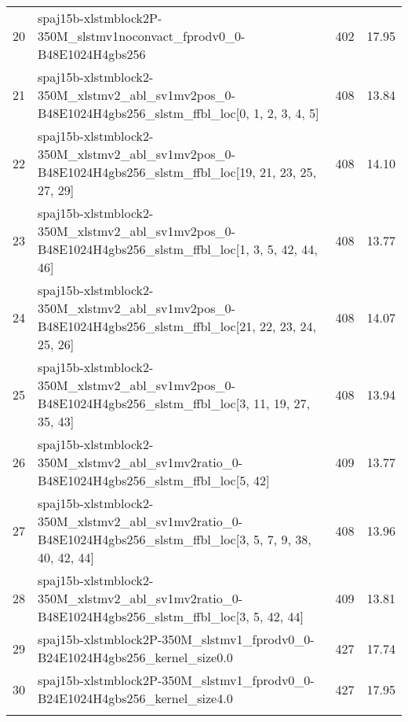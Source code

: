 \begin{tabular}{llrr}
20 & spaj15b-xlstmblock2P-350M_slstmv1noconvact_fprodv0_0-B48E1024H4gbs256 & 402 & 17.95 \\
21 & spaj15b-xlstmblock2-350M_xlstmv2_abl_sv1mv2pos_0-B48E1024H4gbs256_slstm_ffbl_loc[0, 1, 2, 3, 4, 5] & 408 & 13.84 \\
22 & spaj15b-xlstmblock2-350M_xlstmv2_abl_sv1mv2pos_0-B48E1024H4gbs256_slstm_ffbl_loc[19, 21, 23, 25, 27, 29] & 408 & 14.10 \\
23 & spaj15b-xlstmblock2-350M_xlstmv2_abl_sv1mv2pos_0-B48E1024H4gbs256_slstm_ffbl_loc[1, 3, 5, 42, 44, 46] & 408 & 13.77 \\
24 & spaj15b-xlstmblock2-350M_xlstmv2_abl_sv1mv2pos_0-B48E1024H4gbs256_slstm_ffbl_loc[21, 22, 23, 24, 25, 26] & 408 & 14.07 \\
25 & spaj15b-xlstmblock2-350M_xlstmv2_abl_sv1mv2pos_0-B48E1024H4gbs256_slstm_ffbl_loc[3, 11, 19, 27, 35, 43] & 408 & 13.94 \\
26 & spaj15b-xlstmblock2-350M_xlstmv2_abl_sv1mv2ratio_0-B48E1024H4gbs256_slstm_ffbl_loc[5, 42] & 409 & 13.77 \\
27 & spaj15b-xlstmblock2-350M_xlstmv2_abl_sv1mv2ratio_0-B48E1024H4gbs256_slstm_ffbl_loc[3, 5, 7, 9, 38, 40, 42, 44] & 408 & 13.96 \\
28 & spaj15b-xlstmblock2-350M_xlstmv2_abl_sv1mv2ratio_0-B48E1024H4gbs256_slstm_ffbl_loc[3, 5, 42, 44] & 409 & 13.81 \\
29 & spaj15b-xlstmblock2P-350M_slstmv1_fprodv0_0-B24E1024H4gbs256_kernel_size0.0 & 427 & 17.74 \\
30 & spaj15b-xlstmblock2P-350M_slstmv1_fprodv0_0-B24E1024H4gbs256_kernel_size4.0 & 427 & 17.95 \\
\bottomrule

\caption{xLSTM Model Ablations Test PPL}
\end{tabular}
